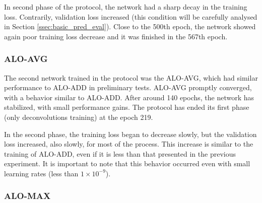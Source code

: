 In second phase of the protocol, the network had a sharp decay in the training loss. %
Contrarily, validation loss increased (this condition will be carefully analysed in Section \ref{ssec:basic_pred_eval}).
Close to the 500th epoch, the network showed again poor training loss decrease and it was finished in the 567th epoch.

\subsubsection{ALO-AVG}
\label{ssec:bsds_subexp1_avg}

The second network trained in the protocol was the ALO-AVG, which had similar performance to ALO-ADD in preliminary tests.
ALO-AVG promptly converged, with a behavior similar to ALO-ADD.
After around 140 epochs, the network has stabilized, with small performance gains. 
The protocol has ended its first phase (only deconvolutions training) at the epoch 219.



In the second phase, the training loss began to decrease slowly, but the validation loss increased, also slowly, for most of the process.
This increase is similar to the training of ALO-ADD, even if it is less than that presented in the previous experiment.
It is important to note that this behavior occurred even with small learning rates (less than $1 \times 10^{-9}$). 

\subsubsection{ALO-MAX}
\label{ssec:bsds_subexp1_max}

